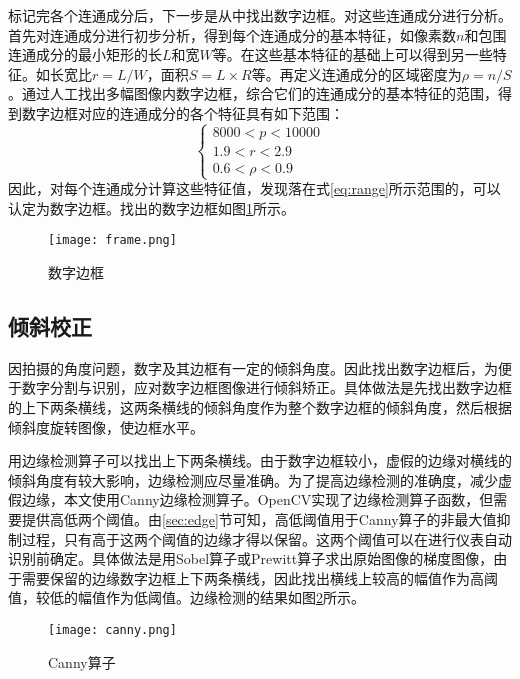 标记完各个连通成分后，下一步是从中找出数字边框。对这些连通成分进行分析。首先对连通成分进行初步分析，得到每个连通成分的基本特征，如像素数$n$和包围连通成分的最小矩形的长$L$和宽$W$等。在这些基本特征的基础上可以得到另一些特征。如长宽比$r=L/W$，面积$S=L\times R$等。再定义连通成分的区域密度为$\rho=n/S$。通过人工找出多幅图像内数字边框，综合它们的连通成分的基本特征的范围，得到数字边框对应的连通成分的各个特征具有如下范围：
\begin{equation}
  \label{eq:range}
  \begin{cases}
    8000  <  p  <  10000 \\
1.9  <  r  <  2.9 \\
0.6  <  \rho  < 0.9 
  \end{cases}
\end{equation}
因此，对每个连通成分计算这些特征值，发现落在式\eqref{eq:range}所示范围的，可以认定为数字边框。找出的数字边框如图\ref{eq:frame}所示。
\begin{figure}[h]
  \centering
  \texttt{[image: frame.png]}
  \caption{数字边框}
  \label{eq:frame}
\end{figure}

\subsection{倾斜校正}

因拍摄的角度问题，数字及其边框有一定的倾斜角度。因此找出数字边框后，为便于数字分割与识别，应对数字边框图像进行倾斜矫正。具体做法是先找出数字边框的上下两条横线，这两条横线的倾斜角度作为整个数字边框的倾斜角度，然后根据倾斜度旋转图像，使边框水平。

用边缘检测算子可以找出上下两条横线。由于数字边框较小，虚假的边缘对横线的倾斜角度有较大影响，边缘检测应尽量准确。为了提高边缘检测的准确度，减少虚假边缘，本文使用Canny边缘检测算子。OpenCV实现了边缘检测算子函数，但需要提供高低两个阈值。由\ref{sec:edge}节可知，高低阈值用于Canny算子的非最大值抑制过程，只有高于这两个阈值的边缘才得以保留。这两个阈值可以在进行仪表自动识别前确定。具体做法是用Sobel算子或Prewitt算子求出原始图像的梯度图像，由于需要保留的边缘数字边框上下两条横线，因此找出横线上较高的幅值作为高阈值，较低的幅值作为低阈值。边缘检测的结果如图\ref{fig:canny}所示。
\begin{figure}[h]
  \centering
  \texttt{[image: canny.png]}
  \caption{Canny算子}
  \label{fig:canny}
\end{figure}

